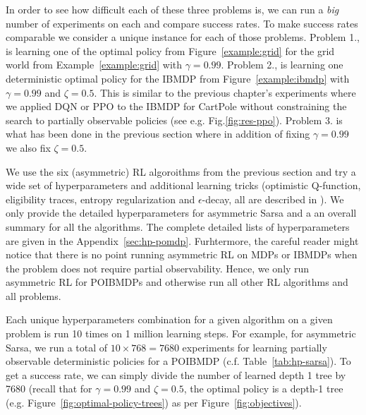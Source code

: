 In order to see how difficult each of these three problems is, we can run a \textit{big} number of experiments on each and compare success rates.
To make success rates comparable we consider a unique instance for each of those problems.
Problem 1., is learning one of the optimal policy from Figure~\ref{example:grid} for the grid world from Example~\ref{example:grid} with $\gamma=0.99$.
Problem 2., is learning one deterministic optimal policy for the IBMDP from Figure~\ref{example:ibmdp} with $\gamma=0.99$ and $\zeta=0.5$.
This is similar to the previous chapter's experiments where we applied DQN or PPO to the IBMDP for CartPole without constraining the search to partially observable policies (see e.g. Fig.\ref{fig:res-ppo}).
Problem 3. is what has been done in the previous section where in addition of fixing $\gamma=0.99$ we also fix $\zeta=0.5$.

We use the six (asymmetric) RL algoroithms from the previous section and try a wide set of hyperparameters and additional learning tricks (optimistic Q-function, eligibility traces, entropy regularization and $\epsilon$-decay, all are described in \cite{sutton}).
We only provide the detailed hyperparameters for asymmetric Sarsa and a an overall summary for all the algorithms.
The complete detailed lists of hyperparameters are given in the Appendix~\ref{sec:hp-pomdp}.
Furhtermore, the careful reader might notice that there is no point running asymmetric RL on MDPs or IBMDPs when the problem does not require partial observability.
Hence, we only run asymmetric RL for POIBMDPs and otherwise run all other RL algorithms and all problems.

Each unique hyperparameters combination for a given algorithm on a given problem is run 10 times on 1 million learning steps.
For example, for asymmetric Sarsa, we run a total of $10\times 768= 7680$ experiments for learning partially observable deterministic policies for a POIBMDP (c.f. Table~\ref{tab:hp-sarsa}).
To get a success rate, we can simply divide the number of learned depth 1 tree by 7680 (recall that for $\gamma=0.99$ and $\zeta=0.5$, the optimal policy is a depth-1 tree (e.g. Figure~\ref{fig:optimal-policy-trees}) as per Figure~\ref{fig:objectives}). 

